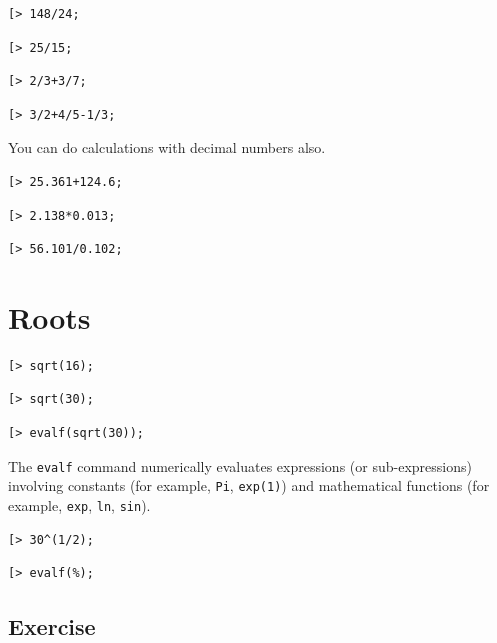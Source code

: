 \documentclass[
]{book}
\theoremstyle{definition}
\theoremstyle{definition}
\theoremstyle{definition}
\theoremstyle{definition}
\theoremstyle{remark}
\begin{document}
\begin{verbatim}
[> 148/24;
\end{verbatim}

\begin{verbatim}
[> 25/15;
\end{verbatim}

\begin{verbatim}
[> 2/3+3/7;
\end{verbatim}

\begin{verbatim}
[> 3/2+4/5-1/3;
\end{verbatim}

You can do calculations with decimal numbers also.

\begin{verbatim}
[> 25.361+124.6;
\end{verbatim}

\begin{verbatim}
[> 2.138*0.013;
\end{verbatim}

\begin{verbatim}
[> 56.101/0.102;
\end{verbatim}

\section{Roots}\label{roots}

\begin{verbatim}
[> sqrt(16);
\end{verbatim}

\begin{verbatim}
[> sqrt(30);
\end{verbatim}

\begin{verbatim}
[> evalf(sqrt(30));
\end{verbatim}

The \texttt{evalf} command numerically evaluates expressions (or sub-expressions) involving constants (for example, \texttt{Pi}, \texttt{exp(1)}) and mathematical functions (for example, \texttt{exp}, \texttt{ln}, \texttt{sin}).

\begin{verbatim}
[> 30^(1/2);
\end{verbatim}

\begin{verbatim}
[> evalf(%);
\end{verbatim}

\subsection{Exercise}\label{exercise}
\end{document}
